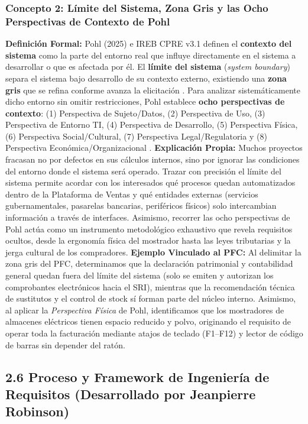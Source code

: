 \documentclass[conference,10pt]{IEEEtran}
\begin{document}
	\subsubsection{Concepto 2: Límite del Sistema, Zona Gris y las Ocho Perspectivas de Contexto de Pohl}
	\textbf{Definición Formal:} Pohl (2025) \cite{pohl2025} e IREB CPRE v3.1 \cite{ireb2023} definen el \textbf{contexto del sistema} como la parte del entorno real que influye directamente en el sistema a desarrollar o que es afectada por él. El \textbf{límite del sistema} (\textit{system boundary}) separa el sistema bajo desarrollo de su contexto externo, existiendo una \textbf{zona gris} que se refina conforme avanza la elicitación \cite{pohl2025}. Para analizar sistemáticamente dicho entorno sin omitir restricciones, Pohl establece \textbf{ocho perspectivas de contexto}: (1) Perspectiva de Sujeto/Datos, (2) Perspectiva de Uso, (3) Perspectiva de Entorno TI, (4) Perspectiva de Desarrollo, (5) Perspectiva Física, (6) Perspectiva Social/Cultural, (7) Perspectiva Legal/Regulatoria y (8) Perspectiva Económica/Organizacional \cite{pohl2025}.
	\textbf{Explicación Propia:} Muchos proyectos fracasan no por defectos en sus cálculos internos, sino por ignorar las condiciones del entorno donde el sistema será operado. Trazar con precisión el límite del sistema permite acordar con los interesados qué procesos quedan automatizados dentro de la Plataforma de Ventas y qué entidades externas (servicios gubernamentales, pasarelas bancarias, periféricos físicos) solo intercambian información a través de interfaces. Asimismo, recorrer las ocho perspectivas de Pohl actúa como un instrumento metodológico exhaustivo que revela requisitos ocultos, desde la ergonomía física del mostrador hasta las leyes tributarias y la jerga cultural de los compradores.
	\textbf{Ejemplo Vinculado al PFC:} Al delimitar la zona gris del PFC, determinamos que la declaración patrimonial y contabilidad general quedan fuera del límite del sistema (solo se emiten y autorizan los comprobantes electrónicos hacia el SRI), mientras que la recomendación técnica de sustitutos y el control de stock sí forman parte del núcleo interno. Asimismo, al aplicar la \textit{Perspectiva Física} de Pohl, identificamos que los mostradores de almacenes eléctricos tienen espacio reducido y polvo, originando el requisito de operar toda la facturación mediante atajos de teclado (F1--F12) y lector de código de barras sin depender del ratón.
	\subsection{2.6 Proceso y Framework de Ingeniería de Requisitos (Desarrollado por Jeanpierre Robinson)}
\end{document}
